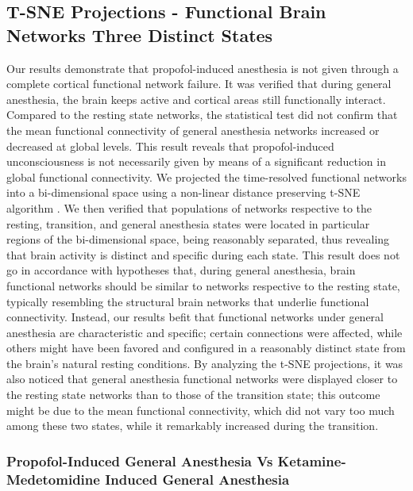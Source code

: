 \documentclass[twoside]{article}
\begin{document}
\begin{multicols}{2}
\subsection{T-SNE Projections - Functional Brain Networks Three Distinct States}

\enlargethispage{-1.5\baselineskip}


Our results demonstrate that propofol-induced anesthesia is not given through a complete cortical functional network failure. It was verified that during general anesthesia, the brain keeps active and cortical areas still functionally interact. Compared to the resting state networks, the statistical test did not confirm that the mean functional connectivity of general anesthesia networks increased or decreased at global levels. This result reveals that propofol-induced unconsciousness is not necessarily given by means of a significant reduction in global functional connectivity. We projected the time-resolved functional networks into a bi-dimensional space using a non-linear distance preserving t-SNE algorithm \citep{van2008visualizing}. We then verified that populations of networks respective to the resting, transition, and general anesthesia states were located in particular regions of the bi-dimensional space, being reasonably separated, thus revealing that brain activity is distinct and specific during each state. This result does not go in accordance with hypotheses that, during general anesthesia, brain functional networks should be similar to networks respective to the resting state, typically resembling the structural brain networks that underlie functional connectivity. Instead, our results befit that functional networks under general anesthesia are characteristic and specific; certain connections were affected, while others might have been favored and configured in a reasonably distinct state from the brain's natural resting conditions. By analyzing the t-SNE projections, it was also noticed that general anesthesia functional networks were displayed closer to the resting state networks than to those of the transition state; this outcome might be due to the mean functional connectivity, which did not vary too much among these two states, while it remarkably increased during the transition.


\subsubsection{Propofol-Induced General Anesthesia  Vs Ketamine-Medetomidine Induced General Anesthesia}


\end{multicols}
\end{document}
